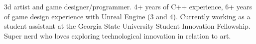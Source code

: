 

\begin{cvparagraph}

3d artist and game designer/programmer. 4+ years of C++ experience, 6+ years of
game design experience with Unreal Engine (3 and 4). Currently working as a 
student assistant at the Georgia State University Student Innovation Fellowship.
Super nerd who loves exploring technological innovation in relation to art.
\end{cvparagraph}
